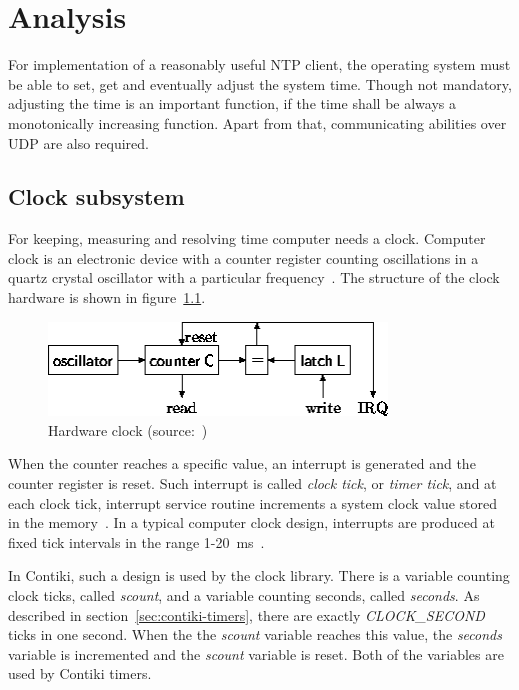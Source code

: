 
\chapter{Analysis}
For implementation of a reasonably useful NTP client,
the operating system must be able to set, get and eventually adjust the system time.
Though not mandatory, adjusting the time is an important function,
if the time shall be always a monotonically increasing function.
Apart from that, communicating abilities over UDP are also required.

\section{Clock subsystem}
For keeping, measuring and resolving time computer needs a clock.
Computer clock is an electronic device with a counter register counting oscillations in a
quartz crystal oscillator with a particular frequency~\cite{thesis-sync}.
The structure of the clock hardware is shown in figure~\ref{fig:system-hardware-clock}.
\begin{figure}
  \centering
  \includegraphics[width=9cm,keepaspectratio]{fig/pc-clock.png}
  \caption{Hardware clock (source:~\cite{thesis-beat})}
  \label{fig:system-hardware-clock}
\end{figure}
When the counter reaches a specific value, an interrupt is generated and the counter register is reset.
Such interrupt is called {\it{clock tick}}, or {\it{timer tick}}, and at each clock tick,
interrupt service routine increments a system clock value stored in the memory~\cite{thesis-sync}.
In a typical computer clock design, interrupts are produced at
fixed tick intervals in the range 1-20~ms~\cite{nanokernel}.

In Contiki, such a design is used by the clock library.
There is a variable counting clock ticks, called {\it{scount}},
and a variable counting seconds, called {\it{seconds}}.
As described in section~\ref{sec:contiki-timers}, there are
exactly {\it{CLOCK\_SECOND}} ticks in one second.
When the the {\it{scount}} variable reaches this value,
the {\it{seconds}} variable is incremented and the {\it{scount}} variable is reset.
Both of the variables are used by Contiki timers.

